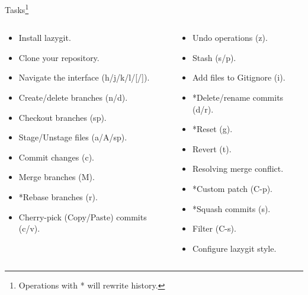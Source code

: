 \documentclass[aspectratio=169]{beamer}
\begin{document}
\begin{frame}{Tasks\footnote{Operations with * will rewrite history.}}
    \begin{columns}
        \begin{column}{0.6\textwidth}
            \begin{itemize}[<+->]
                \item Install lazygit.
                \item Clone your repository.
                \item Navigate the interface (h/j/k/l/[/]).
                \item Create/delete branches (n/d).
                \item Checkout branches (sp).
                \item Stage/Unstage files (a/A/sp).
                \item Commit changes (c).
                \item Merge branches (M).
                \item *Rebase branches (r).
                \item Cherry-pick (Copy/Paste) commits (c/v).
            \end{itemize}
        \end{column}
        \begin{column}{0.5\textwidth}
            \begin{itemize}[<+->]
                \item Undo operations (z).
                \item Stash (s/p).
                \item Add files to Gitignore (i).
                \item *Delete/rename commits (d/r).
                \item *Reset (g).
                \item Revert (t).
                \item Resolving merge conflict.
                \item *Custom patch (C-p).
                \item *Squash commits (s).
                \item Filter (C-s).
                \item Configure lazygit style.
            \end{itemize}
        \end{column}
    \end{columns}
\end{frame}
\end{document}
